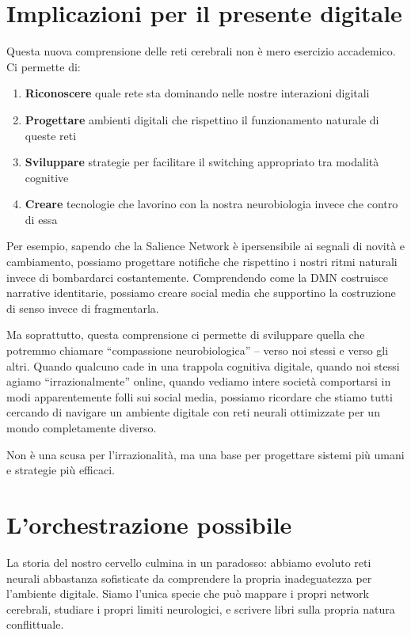 \section{Implicazioni per il presente digitale}

Questa nuova comprensione delle reti cerebrali non è mero esercizio accademico. Ci permette di:

\begin{enumerate}
\item \textbf{Riconoscere} quale rete sta dominando nelle nostre interazioni digitali
\item \textbf{Progettare} ambienti digitali che rispettino il funzionamento naturale di queste reti
\item \textbf{Sviluppare} strategie per facilitare il switching appropriato tra modalità cognitive
\item \textbf{Creare} tecnologie che lavorino con la nostra neurobiologia invece che contro di essa
\end{enumerate}

Per esempio, sapendo che la Salience Network è ipersensibile ai segnali di novità e cambiamento, possiamo progettare notifiche che rispettino i nostri ritmi naturali invece di bombardarci costantemente. Comprendendo come la DMN costruisce narrative identitarie, possiamo creare social media che supportino la costruzione di senso invece di fragmentarla.

Ma soprattutto, questa comprensione ci permette di sviluppare quella che potremmo chiamare ``compassione neurobiologica'' – verso noi stessi e verso gli altri. Quando qualcuno cade in una trappola cognitiva digitale, quando noi stessi agiamo ``irrazionalmente'' online, quando vediamo intere società comportarsi in modi apparentemente folli sui social media, possiamo ricordare che stiamo tutti cercando di navigare un ambiente digitale con reti neurali ottimizzate per un mondo completamente diverso.

Non è una scusa per l'irrazionalità, ma una base per progettare sistemi più umani e strategie più efficaci.

\section{L'orchestrazione possibile}

La storia del nostro cervello culmina in un paradosso: abbiamo evoluto reti neurali abbastanza sofisticate da comprendere la propria inadeguatezza per l'ambiente digitale. Siamo l'unica specie che può mappare i propri network cerebrali, studiare i propri limiti neurologici, e scrivere libri sulla propria natura conflittuale.

